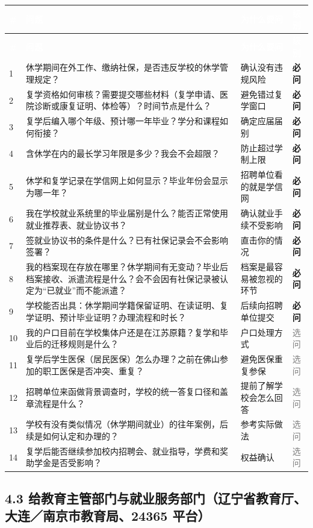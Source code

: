 \documentclass[UTF8,fontset=fandol,zihao=-4]{ctexart}
\newcommand{\hc}[1]{\textcolor{white}{\heiti\bfseries #1}}
\newcommand{\reqq}{\textcolor{highc}{\bfseries 必问}}
\newcommand{\optt}{\textcolor{gray}{选问}}
\begin{document}
\begingroup
{}
\begin{longtable}{@{}P{0.87cm}P{7.18cm}P{5.43cm}P{1.65cm}@{}}
\hc{\#} & \hc{问题} & \hc{为什么要问} & \hc{级别}\\
\endfirsthead
{}\hc{\#} & \hc{问题} & \hc{为什么要问} & \hc{级别}\\
 & 休学期间在外工作、缴纳社保，是否违反学校的休学管理规定？ & 确认没有违规风险 & \reqq{}\\
2 & 复学资格如何审核？需要提交哪些材料（复学申请、医院诊断或康复证明、体检等）？时间节点是什么？ & 避免错过复学窗口 & \reqq{}\\
3 & 复学后编入哪个年级、预计哪一年毕业？学分和课程如何衔接？ & 确定应届届别 & \reqq{}\\
4 & 含休学在内的最长学习年限是多少？我会不会超限？ & 防止超过学制上限 & \reqq{}\\
5 & 休学和复学记录在学信网上如何显示？毕业年份会显示为哪一年？ & 招聘单位看的就是学信网 & \reqq{}\\
6 & 我在学校就业系统里的毕业届别是什么？能否正常使用就业推荐表、就业协议书？ & 确认就业手续不受影响 & \reqq{}\\
7 & 签就业协议书的条件是什么？已有社保记录会不会影响签署？ & 直击你的情况 & \reqq{}\\
8 & 我的档案现在存放在哪里？休学期间有无变动？毕业后档案接收、派遣流程是什么？会不会因有社保记录被认定为“已就业”而不能派遣？ & 档案是最容易被忽视的环节 & \reqq{}\\
9 & 学校能否出具：休学期间学籍保留证明、在读证明、复学证明、预计毕业证明？办理流程和时长？ & 后续向招聘单位提交 & \reqq{}\\
10 & 我的户口目前在学校集体户还是在江苏原籍？复学和毕业后的迁移规则是什么？ & 户口处理方式 & \optt{}\\
11 & 复学后学生医保（居民医保）怎么办理？之前在佛山参加的职工医保是否冲突、重复？ & 避免医保重复参保 & \optt{}\\
12 & 招聘单位来函做背景调查时，学校的统一答复口径和盖章流程是什么？ & 提前了解学校会怎么回答 & \optt{}\\
13 & 学校有没有类似情况（休学期间就业）的往年案例，后续是如何认定和办理的？ & 参考实际做法 & \optt{}\\
14 & 复学后能否继续参加校内招聘会、就业指导，学费和奖助学金是否受影响？ & 权益确认 & \optt{}\\
\end{longtable}
\endgroup

\subsection{4.3 给教育主管部门与就业服务部门（辽宁省教育厅、大连／南京市教育局、24365 平台）}
\end{document}
